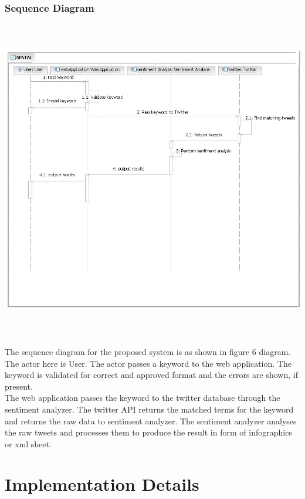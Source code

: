 \documentclass[a4paper,12pt]{report}
\begin{document}
\subsection {Sequence Diagram}
\begin{center}
	\includegraphics[height=14cm]{images/state.jpg}
\end{center}
\hspace*{\parindent}The sequence diagram for the proposed system is as shown in figure 6 diagram.\\
\hspace*{\parindent} The actor here is User. The actor passes a keyword to the web application. The keyword is validated for correct and approved format and the errors are shown, if present.\\
\hspace*{\parindent} The web application passes the keyword to the twitter database through the sentiment analyzer. The twitter API returns the matched terms for the keyword and returns the raw data to sentiment analyzer. The sentiment analyzer analyses the raw tweets and processes them to produce the result in form of infographics or xml sheet.	

\chapter{Implementation Details}
\end{document}
